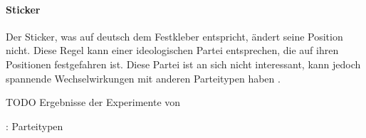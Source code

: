 \paragraph{Sticker} Der Sticker, was auf deutsch dem Festkleber entspricht, ändert seine Position nicht. Diese Regel kann einer ideologischen Partei entsprechen, die auf ihren Positionen festgefahren ist. Diese Partei ist an sich nicht interessant, kann jedoch spannende Wechselwirkungen mit anderen Parteitypen haben \citep[S.\,267]{laver2005policy}.

TODO Ergebnisse der Experimente von \citep{laver2005policy}

\cite{laver2007endogenousParties}: Parteitypen %
